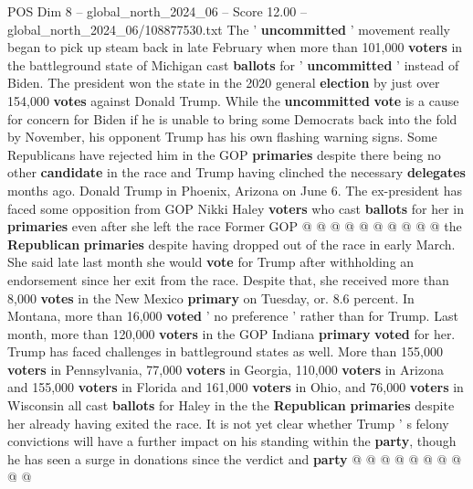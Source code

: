 \begin{textsample}{POS Dim 8 – global\_north\_2024\_06 – Score 12.00 – global\_north\_2024\_06/108877530.txt}
The ' \textbf{uncommitted} ' movement really began to pick up steam back in late February when more than 101,000 \textbf{voters} in the battleground state of Michigan cast \textbf{ballots} for ' \textbf{uncommitted} ' instead of Biden.
The president won the state in the 2020 general \textbf{election} by just over 154,000 \textbf{votes} against Donald Trump.
While the \textbf{uncommitted} \textbf{vote} is a cause for concern for Biden if he is unable to bring some Democrats back into the fold by November, his opponent Trump has his own flashing warning signs.
Some Republicans have rejected him in the GOP \textbf{primaries} despite there being no other \textbf{candidate} in the race and Trump having clinched the necessary \textbf{delegates} months ago.
Donald Trump in Phoenix, Arizona on June 6.
The ex-president has faced some opposition from GOP Nikki Haley \textbf{voters} who cast \textbf{ballots} for her in \textbf{primaries} even after she left the race Former GOP @ @ @ @ @ @ @ @ @ @ the \textbf{Republican} \textbf{primaries} despite having dropped out of the race in early March.
She said late last month she would \textbf{vote} for Trump after withholding an endorsement since her exit from the race.
Despite that, she received more than 8,000 \textbf{votes} in the New Mexico \textbf{primary} on Tuesday, or. 8.6 percent.
In Montana, more than 16,000 \textbf{voted} ' no preference ' rather than for Trump.
Last month, more than 120,000 \textbf{voters} in the GOP Indiana \textbf{primary} \textbf{voted} for her.
Trump has faced challenges in battleground states as well.
More than 155,000 \textbf{voters} in Pennsylvania, 77,000 \textbf{voters} in Georgia, 110,000 \textbf{voters} in Arizona and 155,000 \textbf{voters} in Florida and 161,000 \textbf{voters} in Ohio, and 76,000 \textbf{voters} in Wisconsin all cast \textbf{ballots} for Haley in the the \textbf{Republican} \textbf{primaries} despite her already having exited the race.
It is not yet clear whether Trump ' s felony convictions will have a further impact on his standing within the \textbf{party}, though he has seen a surge in donations since the verdict and \textbf{party} @ @ @ @ @ @ @ @ @ @

\end{textsample}
